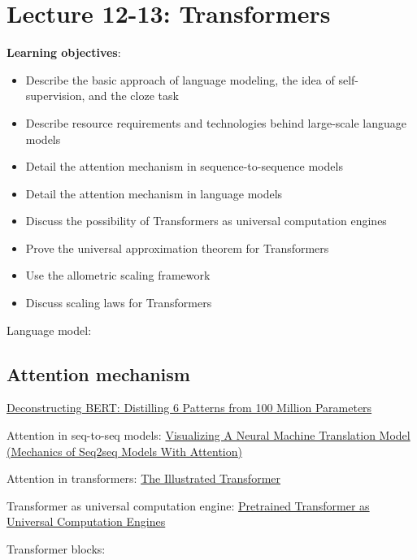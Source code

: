 \documentclass[12pt,a4paper]{article}
\begin{document}
\section{Lecture 12-13: Transformers}
\textbf{Learning objectives}: 
\begin{itemize}
    \item Describe the basic approach of language modeling, the idea of self-supervision, and the cloze task
    \item Describe resource requirements and technologies behind large-scale language models
    \item Detail the attention mechanism in sequence-to-sequence models
    \item Detail the attention mechanism in language models
    \item Discuss the possibility of Transformers as universal computation engines
    \item Prove the universal approximation theorem for Transformers
    \item Use the allometric scaling framework
    \item Discuss scaling laws for Transformers
\end{itemize}

Language model:


\subsection{Attention mechanism} 
\href{https://towardsdatascience.com/deconstructing-bert-distilling-6-patterns-from-100-million-parameters-b49113672f77}{Deconstructing BERT: Distilling 6 Patterns from 100 Million Parameters}

Attention in seq-to-seq models:
\href{https://jalammar.github.io/visualizing-neural-machine-translation-mechanics-of-seq2seq-models-with-attention/}{Visualizing A Neural Machine Translation Model (Mechanics of Seq2seq Models With Attention)}

Attention in transformers:
\href{https://jalammar.github.io/illustrated-transformer/}{The Illustrated Transformer} 

Transformer as universal computation engine: \href{https://www.youtube.com/watch?v=Elxn8rS88bI
Transformers as Universal over Domains}{Pretrained Transformer as Universal Computation Engines}

Transformer blocks:\\
\end{document}
